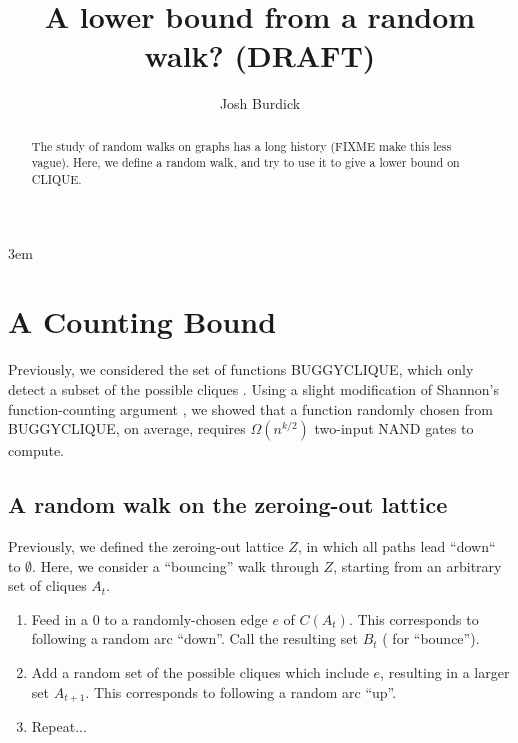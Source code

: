 \documentclass[12pt]{article}
\theoremstyle{definition}
\begin{document}
\emergencystretch 3em
\title{A lower bound from a random walk? (DRAFT)  }

\author{Josh Burdick}

\maketitle

\begin{abstract}
The study of random walks on graphs has a long history (FIXME make this less vague).
Here, we define a random walk, and try to use it to
give a lower bound on CLIQUE.
\end{abstract}

\newpage

\tableofcontents

\vspace{5mm}


\section{A Counting Bound} \label{se:countingBound}

Previously, we considered the set of functions BUGGYCLIQUE, which
only detect a subset of the possible cliques \cite{buggyclique}.
Using a slight modification of Shannon's
function-counting argument \cite{shannon_synthesis_1949},
we showed that a function randomly chosen from BUGGYCLIQUE,
on average, requires $\Omega(n^{k/2})$ two-input NAND gates to compute.

\subsection{A random walk on the zeroing-out lattice}

Previously, we defined the zeroing-out lattice $Z$, in which all paths lead
``down`` to $\emptyset$. Here, we consider a ``bouncing'' walk
through $Z$, starting from an arbitrary set of cliques $A_t$.

\begin{enumerate}

\item Feed in a 0 to a randomly-chosen edge $e$ of $C(A_t)$. 
This corresponds to
following a random arc ``down''. Call the resulting set $B_t$ (
for ``bounce'').

\item Add a random set of the possible cliques which include $e$,
resulting in a larger set $A_{t+1}$. This corresponds to following
a random arc ``up''.

\item Repeat...

\end{enumerate}
\end{document}
